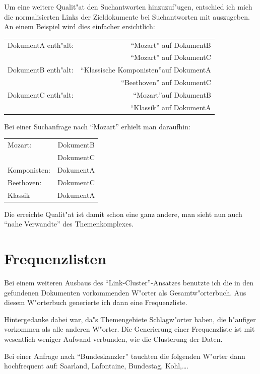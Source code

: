 Um eine weitere Qualit"at den Suchantworten hinzuzuf"ugen, entschied ich mich die normalisierten Links der Zieldokumente bei Suchantworten mit auszugeben. An einem Beispiel wird dies einfacher ersichtlich:
\begin{center}
\begin{tabular}{lr}
DokumentA enth"alt:	&"`Mozart"' auf DokumentB	\\
					&"`Mozart"' auf DokumentC	\\
DokumentB enth"alt:	&"`Klassische Komponisten"'auf DokumentA	\\
					&"`Beethoven"' auf DokumentC	\\
DokumentC enth"alt:	&"`Mozart"'auf DokumentB	\\
					&"`Klassik"' auf DokumentA	\\
\end{tabular}
\end{center}
Bei einer Suchanfrage nach "`Mozart"' erhielt man daraufhin:
\begin{center}
\begin{tabular}{lr}
Mozart:				&DokumentB	\\
					&DokumentC	\\
Komponisten:		&DokumentA	\\
Beethoven:			&DokumentC	\\
Klassik				&DokumentA	\\
\end{tabular}
\end{center}

Die erreichte Qualit"at ist damit schon eine ganz andere, man sieht nun auch "`nahe Verwandte"' des Themenkomplexes.


\section{Frequenzlisten}

Bei einem weiteren Ausbaus des "`Link-Cluster"'-Ansatzes benutzte ich die in den gefundenen Dokumenten vorkommenden W"orter als Gesamtw"orterbuch. Aus diesem W"orterbuch generierte ich dann eine Frequenzliste.

Hintergedanke dabei war, da"s Themengebiete Schlagw"orter haben, die h"aufiger vorkommen als alle anderen W"orter. Die Generierung einer Frequenzliste ist mit wesentlich weniger Aufwand verbunden, wie die Clusterung der Daten.

Bei einer Anfrage nach "`Bundeskanzler"' tauchten die folgenden W"orter dann hochfrequent auf: Saarland, Lafontaine,
Bundestag, Kohl,\dots .

